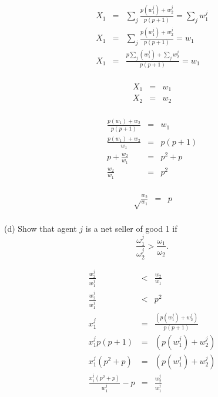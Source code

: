 \begin{eqnarray*}
X_1&=&\sum_{j} \frac{p(w_1^j) + w_2^j}{p(p+1)} = \sum_{j} w_1^j\\
X_1&=&\sum_{j} \frac{p(w_1^j) + w_2^j}{p(p+1)} = w_1\\
X_1&=& \frac{p\sum_{j}(w_1^j) + \sum_{j}w_2^j}{p(p+1)} = w_1\\
\end{eqnarray*}

\begin{myanswerbox}
    \begin{eqnarray*}
        X_1&=& w_1\\
        X_2&=& w_2\\
    \end{eqnarray*}
\end{myanswerbox}

\begin{eqnarray*}
 \frac{p(w_1) + w_2}{p(p+1)} &=& w_1\\
 \frac{p(w_1) + w_2}{w_1} &=& p(p+1)\\
 p+\frac{w_2}{w_1} &=& p^2+p\\
\frac{w_2}{w_1} &=& p^2\\
\end{eqnarray*}

\begin{myanswerbox}
    \begin{eqnarray*}
    \sqrt\frac{w_2}{w_1} &=& p\\
    \end{eqnarray*}
\end{myanswerbox}
\begin{tcolorbox}
    (d) Show that agent \( j \) is a net seller of good 1 if
    \[
    \frac{\omega^j_1}{\omega^j_2} > \frac{\omega_1}{\omega_2}.
    \]
\end{tcolorbox}

\begin{eqnarray*}
\frac{w_2^j}{w_1^j}&<&\frac{w_2}{w_1}\\
\frac{w_2^j}{w_1^j}&<&p^2\\
x_1^j&=&\frac{(p(w_1^j)+w_2^j)}{p(p+1)}\\
x_1^jp(p+1)&=&(p(w_1^j)+w_2^j)\\
x_1^j(p^2+p)&=&(p(w_1^j)+w_2^j)\\
\frac{x_1^j(p^2+p)}{w_1^j}-p&=&\frac{w_2^j}{w_1^j}\\
\end{eqnarray*}

